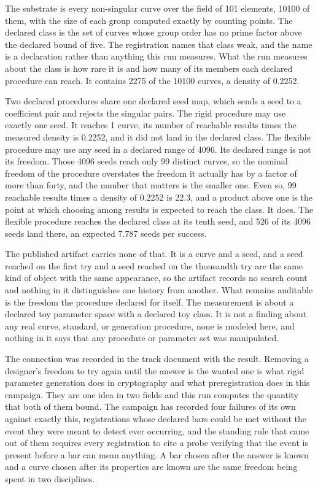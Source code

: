 \documentclass[aps,pre,reprint,nofootinbib]{revtex4-2}
\begin{document}
The substrate is every non-singular curve over the field of 101
elements, 10100 of them, with the size of each group computed exactly
by counting points.  The declared class is the set of curves whose
group order has no prime factor above the declared bound of five.  The
registration names that class weak, and the name is a declaration
rather than anything this run measures.  What the run
measures about the class is how rare it is and how many of its members
each declared procedure can reach.  It contains 2275 of the 10100
curves, a density of 0.2252.

Two declared procedures share one declared seed map, which sends a
seed to a coefficient pair and rejects the singular pairs.  The rigid
procedure may use exactly one seed.  It reaches 1 curve, its number of
reachable results times the measured density is 0.2252, and it did not
land in the declared class.  The flexible procedure may use any seed
in a declared range of 4096.  Its declared range is not its freedom.
Those 4096 seeds reach only 99 distinct curves, so the nominal freedom
of the procedure overstates the freedom it actually has by a factor of
more than forty, and the number that matters is the smaller one.  Even
so, 99 reachable results times a density of 0.2252 is 22.3, and a
product above one is the point at which choosing among results is
expected to reach the class.  It does.  The flexible procedure reaches
the declared class at its tenth seed, and 526 of its 4096 seeds land
there, an expected 7.787 seeds per success.

The published artifact carries none of that.  It is a curve and a
seed, and a seed reached on the first try and a seed reached on the
thousandth try are the same kind of object with the same appearance,
so the artifact records no search count and nothing in it distinguishes
one history from another.  What remains auditable is the freedom the
procedure declared for itself.  The
measurement is about a declared toy parameter space with a declared
toy class.  It is not a finding about any real curve, standard, or
generation procedure, none is modeled here, and nothing in it says
that any procedure or parameter set was manipulated.

The connection was recorded in the track document with the result.
Removing a designer's freedom to try again until the answer is the
wanted one is what rigid parameter generation does in cryptography and
what preregistration does in this campaign.  They are one idea in two
fields and this run computes the quantity that both of them bound.
The campaign has recorded four failures of its own against exactly
this, registrations whose declared bars could be met without the event
they were meant to detect ever occurring, and the standing rule that
came out of them requires every registration to cite a probe verifying
that the event is present before a bar can mean anything.  A bar
chosen after the answer is known and a curve chosen after its
properties are known are the same freedom being spent in two
disciplines.
\end{document}
